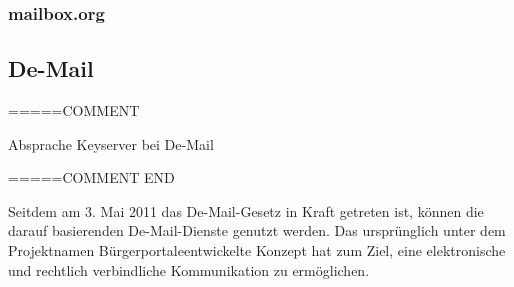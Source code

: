 \documentclass  [paper=a4,
				fontsize=12pt,
				listof=totoc,
				bibliography=totoc
				]{scrreprt}
\begin{document}
				
			\subsubsection{mailbox.org}
			\label{subsubsec:mailbox}
				
			\subsection{De-Mail}
			
			=====COMMENT
			
			Absprache Keyserver bei De-Mail
			
			=====COMMENT END
			
			Seitdem am 3. Mai 2011 das De-Mail-Gesetz in Kraft getreten ist, können die darauf basierenden De-Mail-Dienste genutzt werden.
			Das ursprünglich unter dem Projektnamen \glqq Bürgerportale\grqq entwickelte Konzept hat zum Ziel, eine elektronische und rechtlich verbindliche Kommunikation zu ermöglichen.
\end{document}
